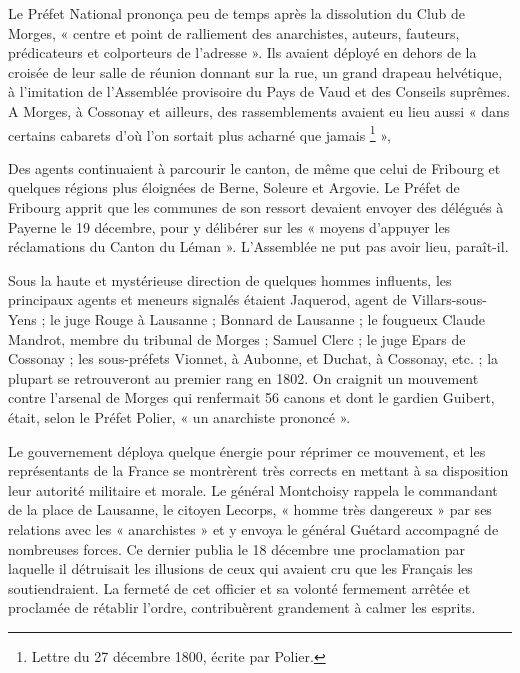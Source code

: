 \documentclass[french,twoside]{book} %
\begin{document}
\noindent Le Préfet National prononça peu de temps après la dissolution du Club de Morges, « centre et point de ralliement des anarchistes, auteurs, fauteurs, prédicateurs et colporteurs de l’adresse ». Ils avaient déployé en dehors de la croisée de leur salle de réunion donnant sur la rue, un grand drapeau helvétique, à l’imitation de l’Assemblée provisoire du Pays de Vaud et des Conseils suprêmes. A Morges, à Cossonay et ailleurs, des rassemblements avaient eu lieu aussi « dans certains cabarets d’où l’on sortait plus acharné que jamais \footnote{Lettre du 27 décembre 1800, écrite par Polier.} »,\par
Des agents continuaient à parcourir le canton, de même que celui de Fribourg et quelques régions plus éloignées de Berne, Soleure et Argovie. Le Préfet de Fribourg apprit que les communes de son ressort devaient envoyer des délégués à Payerne le 19 décembre, pour y délibérer sur les « moyens d’appuyer les réclamations du Canton du Léman ». L’Assemblée ne put pas avoir lieu, paraît-il.\par
Sous la haute et mystérieuse direction de quelques hommes influents, les principaux agents et meneurs signalés étaient Jaquerod, agent de Villars-sous-Yens ; le juge Rouge à Lausanne ; Bonnard de Lausanne ; le fougueux Claude Mandrot, membre du tribunal de Morges ; Samuel Clerc ; le juge Epars de Cossonay ; les sous-préfets Vionnet, à Aubonne, et Duchat, à Cossonay, etc. ; la plupart se retrouveront au premier rang en 1802. On craignit un mouvement contre l’arsenal de Morges qui renfermait 56 canons et dont le gardien Guibert, était, selon le Préfet Polier, « un anarchiste prononcé ».\par
Le gouvernement déploya quelque énergie pour réprimer ce mouvement, et les représentants de la France se montrèrent très corrects en mettant à sa disposition leur autorité militaire et morale. Le général Montchoisy rappela le commandant de la place de Lausanne, le citoyen Lecorps, « homme très dangereux » par ses relations avec les « anarchistes » et y envoya le général Guétard accompagné de nombreuses forces. Ce dernier publia le 18 décembre une proclamation par laquelle il détruisait les illusions de ceux qui avaient cru que les Français les soutiendraient. La fermeté de cet officier et sa volonté fermement arrêtée et proclamée de rétablir l’ordre, contribuèrent grandement à calmer les esprits.\par
\end{document}
